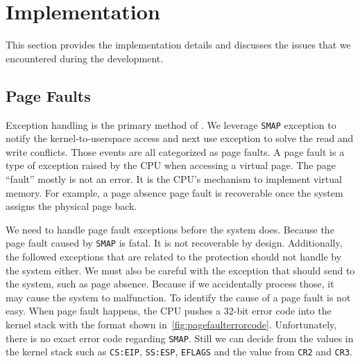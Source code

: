 

\section{Implementation}
\label{sec:ktoctou-implementation}

This section provides the implementation details and discusses the issues that we encountered during the development.



\subsection{Page Faults}


Exception handling is the primary method of \name. We leverage \texttt{SMAP} exception to notify the kernel-to-userspace access and next use exception to solve the read and write conflicts. Those events are all categorized as page faults. A page fault is a type of exception raised by the CPU when accessing a virtual page. The page ``fault'' mostly is not an error. It is the CPU's mechanism to implement virtual memory. For example, a page absence page fault is recoverable once the system assigns the physical page back.

We need to handle page fault exceptions before the system does.
Because the page fault caused by \texttt{SMAP} is fatal. It is not recoverable by design. Additionally, the followed exceptions that are related to the protection should not handle by the system either. We must also be careful with the exception that should send to the system, such as page absence. Because if we accidentally process those, it may cause the system to malfunction. To identify the cause of a page fault is not easy.  When page fault happens, the CPU pushes a 32-bit error code into the kernel stack with the format shown in~\autoref{fig:pagefaulterrorcode}.  Unfortunately, there is no exact error code regarding \texttt{SMAP}.  Still we can decide from the values in the kernel stack such as \texttt{CS:EIP}, \texttt{SS:ESP}, \texttt{EFLAGS} and the value from \texttt{CR2} and \texttt{CR3}.

